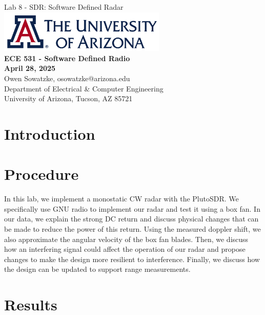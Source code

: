 \documentclass{article}
\begin{document}
\begin{titlepage}
	\centering
	{\huge Lab 8 - SDR: Software Defined Radar}\\[0.25 in]
	\includegraphics[width=0.6\textwidth]{ua_logo.png}\\[0.25 in]
	{\large \textbf{ECE 531 - Software Defined Radio\\[0.25 in]
	April 28, 2025\\[0.25 in]}}
	{\large Owen Sowatzke, osowatzke@arizona.edu\\[0.05 in]
	Department of Electrical \& Computer Engineering\\[0.05 in]
	University of Arizona, Tucson, AZ 85721\\[0.5 in]}
	\hypersetup{linkcolor=navy-blue}
	\noindent\hrulefill
	\tableofcontents
	\noindent\hrulefill
\end{titlepage}


\section{Introduction}

\section{Procedure}

In this lab, we implement a monostatic CW radar with the PlutoSDR. We specifically use GNU radio to implement our radar and test it using a box fan. In our data, we explain the strong DC return and discuss physical changes that can be made to reduce the power of this return. Using the measured doppler shift, we also approximate the angular velocity of the box fan blades. Then, we discuss how an interfering signal could affect the operation of our radar and propose changes to make the design more resilient to interference. Finally, we discuss how the design can be updated to support range measurements.

\section{Results}
\end{document}
